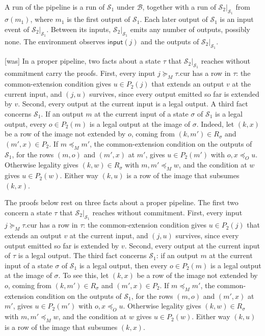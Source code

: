 \documentclass[sigconf]{cidr-2027}
\theoremstyle{remark}
\newcommand{\OutputOrd}{\preceq_O}
\newcommand{\commitment}{commitment\xspace}
\newcommand{\outrel}{extends\xspace}          %
\newcommand{\outrelpast}{extended\xspace}     %
\newcommand{\Spec}{\mathcal{S}}
\begin{document}
A run of the pipeline is a run of $\Spec_1$ under $\mathcal B$, together with
a run of $\Spec_2|_{\Spec_1}$ from $\sigma(m_1)$, where $m_1$ is the first
output of $\Spec_1$.  Each later output of $\Spec_1$ is an input event of
$\Spec_2|_{\Spec_1}$.  Between its inputs, $\Spec_2|_{\Spec_1}$ emits any
number of outputs, possibly none.  The environment observes $\mathsf{input}(j)$
and the outputs of $\Spec_2|_{\Spec_1}$.



{\footnotesize\color{black!50}\noindent\textsf{[was]} In a proper pipeline, two facts about a state $\tau$ that
$\Spec_2|_{\Spec_1}$ reaches without \commitment carry the proofs.  First,
every input $j\succeq_M\tau.\mathrm{cur}$ has a row in $\tau$: the
common-extension condition gives $u\in P_2(j)$ that \outrel an output $v$ at the
current input, and $(j,u)$ survives, since every output emitted so far is
\outrelpast by $v$.  Second, every output at the current input is a legal output.
A third fact concerns $\Spec_1$.  If an output $m$ at the current input of a
state $\sigma$ of $\Spec_1$ is a legal output, every $o\in P_2(m)$ is a legal
output at the image of $\sigma$.  Indeed,
let $(k,x)$ be a row of the image not \outrelpast by $o$, coming from
$(k,m')\in R_\sigma$ and $(m',x)\in P_2$.  If $m\preceq_M m'$, the
common-extension condition on the outputs of $\Spec_1$, for the rows $(m,o)$ and
$(m',x)$ at $m'$, gives $u\in P_2(m')$ with $o,x\OutputOrd u$.  Otherwise
legality gives $(k,w)\in R_\sigma$ with $m,m'\preceq_M w$, and the
condition at $w$ gives $u\in P_2(w)$.  Either way $(k,u)$ is a row of the
image that subsumes $(k,x)$.\par}

\color{blue!70!black}The proofs below rest on three facts about a proper pipeline.  The first two
concern a state $\tau$ that $\Spec_2|_{\Spec_1}$ reaches without \commitment.
First, every input $j\succeq_M\tau.\mathrm{cur}$ has a row in $\tau$: the
common-extension condition gives $u\in P_2(j)$ that \outrel an output $v$ at
the current input, and $(j,u)$ survives, since every output emitted so far is
\outrelpast by $v$.  Second, every output at the current input of $\tau$ is a
legal output.  The third fact concerns $\Spec_1$: if an output $m$ at the
current input of a state $\sigma$ of $\Spec_1$ is a legal output, then every
$o\in P_2(m)$ is a legal output at the image of $\sigma$.  To see this, let
$(k,x)$ be a row of the image not \outrelpast by $o$, coming from
$(k,m')\in R_\sigma$ and $(m',x)\in P_2$.  If $m\preceq_M m'$, the
common-extension condition on the outputs of $\Spec_1$, for the rows $(m,o)$ and
$(m',x)$ at $m'$, gives $u\in P_2(m')$ with $o,x\OutputOrd u$.  Otherwise
legality gives $(k,w)\in R_\sigma$ with $m,m'\preceq_M w$, and the
condition at $w$ gives $u\in P_2(w)$.  Either way $(k,u)$ is a row of the
image that subsumes $(k,x)$.\color{black}
\end{document}
